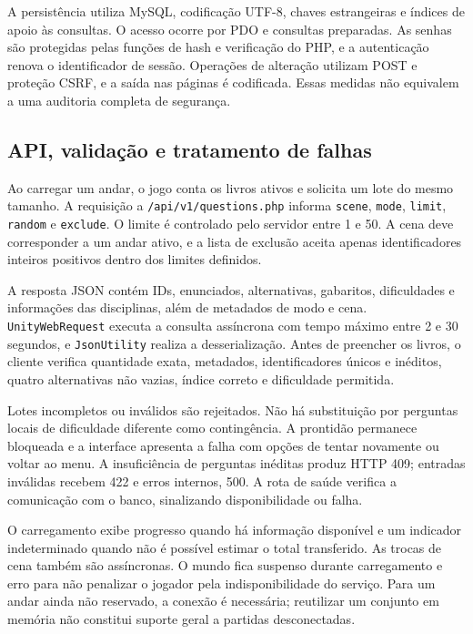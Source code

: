 \documentclass[12pt]{article}
\begin{document}
A persistência utiliza MySQL, codificação UTF-8, chaves estrangeiras e índices de apoio às consultas. O acesso ocorre por PDO e consultas preparadas. As senhas são protegidas pelas funções de hash e verificação do PHP, e a autenticação renova o identificador de sessão. Operações de alteração utilizam POST e proteção CSRF, e a saída nas páginas é codificada. Essas medidas não equivalem a uma auditoria completa de segurança.

\subsection{API, validação e tratamento de falhas}

Ao carregar um andar, o jogo conta os livros ativos e solicita um lote do mesmo tamanho. A requisição a \texttt{/api/v1/questions.php} informa \texttt{scene}, \texttt{mode}, \texttt{limit}, \texttt{random} e \texttt{exclude}. O limite é controlado pelo servidor entre 1 e 50. A cena deve corresponder a um andar ativo, e a lista de exclusão aceita apenas identificadores inteiros positivos dentro dos limites definidos.

A resposta JSON contém IDs, enunciados, alternativas, gabaritos, dificuldades e informações das disciplinas, além de metadados de modo e cena. \texttt{UnityWebRequest} executa a consulta assíncrona com tempo máximo entre 2 e 30 segundos, e \texttt{JsonUtility} realiza a desserialização. Antes de preencher os livros, o cliente verifica quantidade exata, metadados, identificadores únicos e inéditos, quatro alternativas não vazias, índice correto e dificuldade permitida.

Lotes incompletos ou inválidos são rejeitados. Não há substituição por perguntas locais de dificuldade diferente como contingência. A prontidão permanece bloqueada e a interface apresenta a falha com opções de tentar novamente ou voltar ao menu. A insuficiência de perguntas inéditas produz HTTP 409; entradas inválidas recebem 422 e erros internos, 500. A rota de saúde verifica a comunicação com o banco, sinalizando disponibilidade ou falha.

O carregamento exibe progresso quando há informação disponível e um indicador indeterminado quando não é possível estimar o total transferido. As trocas de cena também são assíncronas. O mundo fica suspenso durante carregamento e erro para não penalizar o jogador pela indisponibilidade do serviço. Para um andar ainda não reservado, a conexão é necessária; reutilizar um conjunto em memória não constitui suporte geral a partidas desconectadas.
\end{document}
